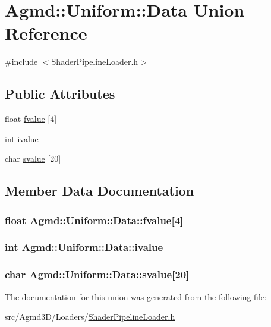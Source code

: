 \hypertarget{union_agmd_1_1_uniform_1_1_data}{\section{Agmd\+:\+:Uniform\+:\+:Data Union Reference}
\label{union_agmd_1_1_uniform_1_1_data}
}


{\ttfamily \#include $<$Shader\+Pipeline\+Loader.\+h$>$}

\subsection*{Public Attributes}
\begin{DoxyCompactItemize}
\item 
float \hyperlink{union_agmd_1_1_uniform_1_1_data_a3507c533ea80a0bdc1f2c6a1ba0f1152}{fvalue} \mbox{[}4\mbox{]}
\item 
int \hyperlink{union_agmd_1_1_uniform_1_1_data_a3885e6ffbf23b8efd7096b94283d2c8e}{ivalue}
\item 
char \hyperlink{union_agmd_1_1_uniform_1_1_data_ac1ea44406382bd248f9a870c7ef06ee5}{svalue} \mbox{[}20\mbox{]}
\end{DoxyCompactItemize}


\subsection{Member Data Documentation}
\hypertarget{union_agmd_1_1_uniform_1_1_data_a3507c533ea80a0bdc1f2c6a1ba0f1152}{
\subsubsection[{fvalue}]{\setlength{\rightskip}{0pt plus 5cm}float Agmd\+::\+Uniform\+::\+Data\+::fvalue\mbox{[}4\mbox{]}}}\label{union_agmd_1_1_uniform_1_1_data_a3507c533ea80a0bdc1f2c6a1ba0f1152}
\hypertarget{union_agmd_1_1_uniform_1_1_data_a3885e6ffbf23b8efd7096b94283d2c8e}{
\subsubsection[{ivalue}]{\setlength{\rightskip}{0pt plus 5cm}int Agmd\+::\+Uniform\+::\+Data\+::ivalue}}\label{union_agmd_1_1_uniform_1_1_data_a3885e6ffbf23b8efd7096b94283d2c8e}
\hypertarget{union_agmd_1_1_uniform_1_1_data_ac1ea44406382bd248f9a870c7ef06ee5}{
\subsubsection[{svalue}]{\setlength{\rightskip}{0pt plus 5cm}char Agmd\+::\+Uniform\+::\+Data\+::svalue\mbox{[}20\mbox{]}}}\label{union_agmd_1_1_uniform_1_1_data_ac1ea44406382bd248f9a870c7ef06ee5}


The documentation for this union was generated from the following file\+:\begin{DoxyCompactItemize}
\item 
src/\+Agmd3\+D/\+Loaders/\hyperlink{_shader_pipeline_loader_8h}{Shader\+Pipeline\+Loader.\+h}\end{DoxyCompactItemize}
